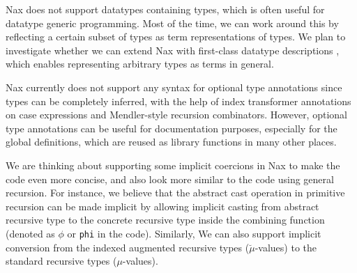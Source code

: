 Nax does not support datatypes containing types, which is often useful
for datatype generic programming. Most of the time, we can work around this
by reflecting a certain subset of types as term representations of types.
We plan to investigate whether we can extend Nax with
first-class datatype descriptions \cite{DagMcb12}, which
enables representing arbitrary types as terms in general.

Nax currently does not support any syntax for optional type annotations
since types can be completely inferred, with the help of index transformer
annotations on case expressions and Mendler-style recursion combinators.
However, optional type annotations can be useful for documentation purposes,
especially for the global definitions, which are reused as library functions
in many other places.

We are thinking about supporting some implicit coercions in Nax
to make the code even more concise, and also look more similar
to the code using general recursion. For instance, we believe
that the abstract cast operation in primitive recursion can be made implicit
by allowing implicit casting from abstract recursive type
to the concrete recursive type inside the combining function
(denoted as $\phi$ or \texttt{phi} in the code). Similarly,
We can also support implicit conversion from the indexed augmented
recursive types ($\breve{\mu}$-values) to the standard recursive types
($\mu$-values).

